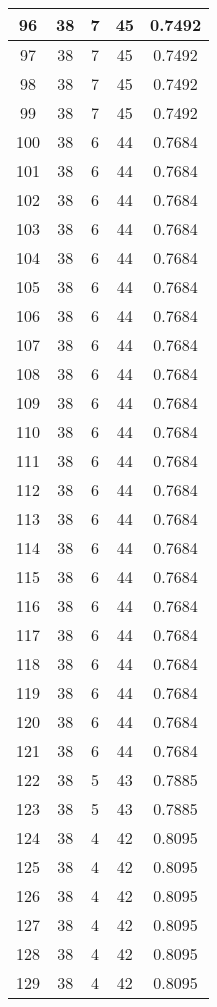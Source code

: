 \documentclass[letterpaper, 12pt]{article}
\begin{document}
\begin{longtable}{|c|c|c|c|c|}
\hline
96 & 38 & 7 & 45 & 0.7492 \\
\hline
97 & 38 & 7 & 45 & 0.7492 \\
\hline
98 & 38 & 7 & 45 & 0.7492 \\
\hline
99 & 38 & 7 & 45 & 0.7492 \\
\hline
100 & 38 & 6 & 44 & 0.7684 \\
\hline
101 & 38 & 6 & 44 & 0.7684 \\
\hline
102 & 38 & 6 & 44 & 0.7684 \\
\hline
103 & 38 & 6 & 44 & 0.7684 \\
\hline
104 & 38 & 6 & 44 & 0.7684 \\
\hline
105 & 38 & 6 & 44 & 0.7684 \\
\hline
106 & 38 & 6 & 44 & 0.7684 \\
\hline
107 & 38 & 6 & 44 & 0.7684 \\
\hline
108 & 38 & 6 & 44 & 0.7684 \\
\hline
109 & 38 & 6 & 44 & 0.7684 \\
\hline
110 & 38 & 6 & 44 & 0.7684 \\
\hline
111 & 38 & 6 & 44 & 0.7684 \\
\hline
112 & 38 & 6 & 44 & 0.7684 \\
\hline
113 & 38 & 6 & 44 & 0.7684 \\
\hline
114 & 38 & 6 & 44 & 0.7684 \\
\hline
115 & 38 & 6 & 44 & 0.7684 \\
\hline
116 & 38 & 6 & 44 & 0.7684 \\
\hline
117 & 38 & 6 & 44 & 0.7684 \\
\hline
118 & 38 & 6 & 44 & 0.7684 \\
\hline
119 & 38 & 6 & 44 & 0.7684 \\
\hline
120 & 38 & 6 & 44 & 0.7684 \\
\hline
121 & 38 & 6 & 44 & 0.7684 \\
\hline
122 & 38 & 5 & 43 & 0.7885 \\
\hline
123 & 38 & 5 & 43 & 0.7885 \\
\hline
124 & 38 & 4 & 42 & 0.8095 \\
\hline
125 & 38 & 4 & 42 & 0.8095 \\
\hline
126 & 38 & 4 & 42 & 0.8095 \\
\hline
127 & 38 & 4 & 42 & 0.8095 \\
\hline
128 & 38 & 4 & 42 & 0.8095 \\
\hline
129 & 38 & 4 & 42 & 0.8095 \\

\end{longtable}
\end{document}
